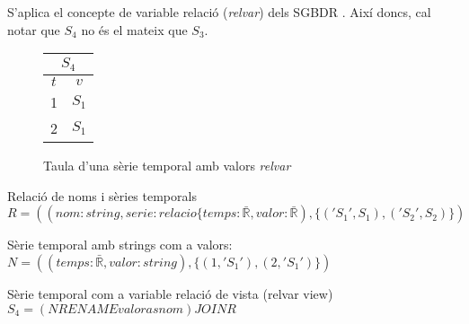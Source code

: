 S'aplica el concepte de variable relació (\emph{relvar}) dels SGBDR \parencite[sec.\ 3.3]{date:introduction}.
Així doncs, cal notar que $S_4$  no és el mateix que $S_3$.
\begin{figure}[tp]
  \centering
  \begin{tabular}{|c|c|}
    \multicolumn{2}{c}{$S_4$} \\ \hline
    $t$  & $v$ \\ \hline
    1 & $S_1$ \\
    2 & $S_1$ \\ \hline
  \end{tabular}
  \caption{Taula d'una sèrie temporal amb valors \emph{relvar}}
  \label{fig:model:serietemporal:relvar}
\end{figure}


Relació de noms i sèries temporals $R =  ((nom:string,serie:relacio\{temps:\bar{\mathbb{R}},valor:\bar{\mathbb{R}}),\{ ('S_1',S_1),('S_2',S_2)  \})$

Sèrie temporal amb strings com a valors:
$N= ( (temps:\bar{\mathbb{R}},valor:string) ,\{ (1,'S_1') , (2,'S_1') \})$

Sèrie temporal com a variable relació de vista (relvar view)
$S_4 =  (N RENAME valor as nom) JOIN R$



















